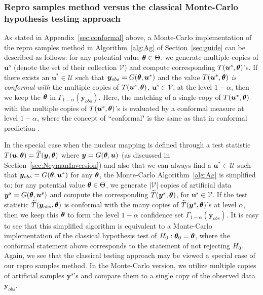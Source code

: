 \documentclass[12pt]{article}
\theoremstyle{shortspace}
\def\*#1{\bm{#1}}
\def\btheta{\mathop{\theta\kern-.45em\hbox{$\theta$}}\nolimits}
\begin{document}
 \subsubsection{ Repro samples method versus the classical Monte-Carlo hypothesis testing approach}  As stated in Appendix~\ref{sec:conformal} above, a Monte-Carlo implementation  of the repro samples method in Algorithm~\ref{alg:Ag} of Section~\ref{sec:guide} can be described as follows: for any potential value $\btheta \in \Theta$, we generate multiple copies of $\*u^s$ (denote the set of their collection ${\mathcal V}$) and compute corresponding $T(\*u^s, \btheta)$'s. If there exists an $\*u^* \in {\mathcal U}$ such that $\*y_{obs} = G(\btheta, \*u^*)$ and the value $T(\*u^*, \btheta)$
{\it is  conformal with} the multiple copies of $T(\*u^s, \btheta)$, $\*u^s \in {\mathcal V}$, at the level $1- \alpha$, then we keep the $\btheta$ in  $\Gamma_{1-\alpha}(\*y_{obs})$. Here, the matching of a single copy of $T(\*u^*, \btheta)$ with the multiple copies of $T(\*u^s, \btheta)$'s is evaluated by a conformal measure at level $1 - \alpha$, where the concept of  ``conformal" is 
the same as that in  conformal prediction \citep{vovk2005algorithmic}. 

In the special case when the nuclear mapping is defined through a test statistic $T(\*u, \btheta) = \widetilde T(\*y, \btheta)$ where $\*y = G(\btheta, \*u)$ (as discussed in Section~\ref{sec:NeymanInversion}) and also that we can always find a $\*u^* \in {\mathcal U}$ such that $\*y_{obs} = G(\btheta, \*u^*)$ for any $\btheta$, the Monte-Carlo Algorithm~\ref{alg:Ag} is simplified to: for any potential value $\btheta \in \Theta$, we generate $|{\mathcal V}|$ copies of artificial data 
$\*y^s = G(\btheta, \*u^s)$ and compute the corresponding $\widetilde T(\*y^s, \btheta)$, for $\*u^s \in {\mathcal V}$. If the test statistic $\widetilde T(\*y_{obs}, \btheta)$ is conformal with the many copies of $\widetilde T(\*y^s, \btheta)$'s at level $\alpha$, then we keep this $\btheta$ to form the level $1 - \alpha$ confidence set $\Gamma_{1-\alpha}(\*y_{obs})$. 
It is easy to see that this simplified algorithm is equivalent to a Monte-Carlo implementation of the classical hypothesis test of $H_0: \btheta_0 = \btheta$, where the conformal statement above corresponds to the statement of not rejecting $H_0$. Again, we see that the classical testing approach may be viewed a special case of our repro samples method. In the Monte-Carlo version, we utilize multiple copies of artificial samples $\*y^s$'s and compare them to a single copy of the observed data $\*y_{obs}$.
\end{document}
